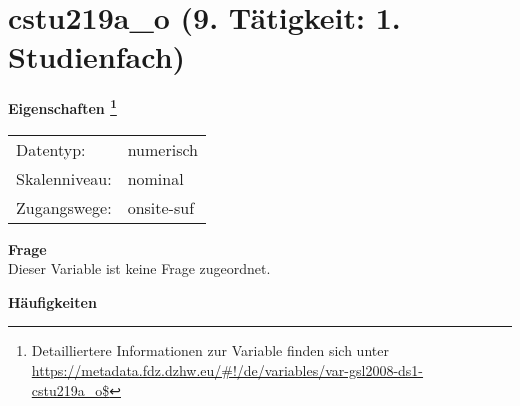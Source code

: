
    \setcounter{footnote}{0}

    \vspace*{-1.8cm}
	\section{cstu219a\_o (9. Tätigkeit: 1. Studienfach)}
	\label{section:cstu219a_o}



    \vspace*{0.5cm}
    \noindent\textbf{Eigenschaften
	\footnote{Detailliertere Informationen zur Variable finden sich unter
		\url{https://metadata.fdz.dzhw.eu/\#!/de/variables/var-gsl2008-ds1-cstu219a_o$}}}\\
	\begin{tabularx}{\hsize}{@{}lX}
	Datentyp: & numerisch \\
	Skalenniveau: & nominal \\
	Zugangswege: &
	  onsite-suf
 \\
    \end{tabularx}



		\vspace*{0.5cm}
		\noindent\textbf{Frage}\\
		Dieser Variable ist keine Frage zugeordnet.





        		\vspace*{0.5cm}
                \noindent\textbf{Häufigkeiten}

